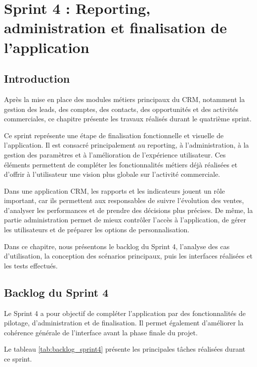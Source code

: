 \documentclass[12pt,a4paper,twoside,openany]{book}
\begin{document}
\chapter{Sprint 4 : Reporting, administration et finalisation de l’application}

\section*{Introduction}

Après la mise en place des modules métiers principaux du CRM, notamment la gestion des leads, des comptes, des contacts, des opportunités et des activités commerciales, ce chapitre présente les travaux réalisés durant le quatrième sprint.

Ce sprint représente une étape de finalisation fonctionnelle et visuelle de l’application. Il est consacré principalement au reporting, à l’administration, à la gestion des paramètres et à l’amélioration de l’expérience utilisateur. Ces éléments permettent de compléter les fonctionnalités métiers déjà réalisées et d’offrir à l’utilisateur une vision plus globale sur l’activité commerciale.

Dans une application CRM, les rapports et les indicateurs jouent un rôle important, car ils permettent aux responsables de suivre l’évolution des ventes, d’analyser les performances et de prendre des décisions plus précises. De même, la partie administration permet de mieux contrôler l’accès à l’application, de gérer les utilisateurs et de préparer les options de personnalisation.

Dans ce chapitre, nous présentons le backlog du Sprint 4, l’analyse des cas d’utilisation, la conception des scénarios principaux, puis les interfaces réalisées et les tests effectués.

\section{Backlog du Sprint 4}

Le Sprint 4 a pour objectif de compléter l’application par des fonctionnalités de pilotage, d’administration et de finalisation. Il permet également d’améliorer la cohérence générale de l’interface avant la phase finale du projet.

Le tableau \ref{tab:backlog_sprint4} présente les principales tâches réalisées durant ce sprint.
\end{document}
